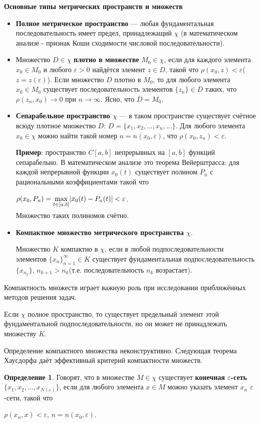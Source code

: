 \documentclass[12pt,a4paper,titlepage]{book}
\theoremstyle{definition}
\newtheorem{definition}{Определение}
\theoremstyle{plain}
\theoremstyle{remark}
\theoremstyle{plain}
\begin{document}
\begin{large}
\textbf{Основные типы метрических пространств и множеств}
\end{large}
\begin{itemize}
\item \textbf{Полное метрическое пространство} --- любая фундаментальная последовательность имеет предел, принадлежащий $\chi$ (в математическом анализе - признак Коши сходимости числовой последовательности).
\item Множество $D\in\chi$ \textbf{плотно в множестве} $ M_0 \in \chi$, если для каждого элемента $x_0 \in M_0$ и любого $\varepsilon>0$ найдётся элемент $z \in D$, такой что $\rho(x_0, z)<\varepsilon$($z=z(\varepsilon)$). Если множество $D$ плотно в $M_0$, то для любого элемента $x_0\in M_0$ существует последовательность элементов $\lbrace z_n \rbrace \in D$ таких, что $\rho(z_n, x_0)\rightarrow0$ при $n\rightarrow\infty$. Ясно, что $\overline{D}=M_0$.
\item \textbf{Сепарабельное пространство $\chi$} --- в таком пространстве существует счётное всюду плотное множество $D$: $D=\lbrace x_1,x_2,\ldots,x_n,\ldots \rbrace$. Для любого элемента $x_0 \in \chi$ можно найти такой номер $n=n(x_0,\varepsilon)$, что $\rho(x_0, z_n)<\varepsilon$.

\textbf{Пример}: пространство $C[a,b]$ непрерывных на $[a,b]$ функций сепарабельно. В математическом анализе это теорема Вейерштрасса: для каждой непрерывной функции $x_0(t)$ существует полином $P_n$ с рациональными коэффициентами такой что
\begin{center}
 $\rho(x_0, P_n)=\smash{\displaystyle\max_{t \in [a,b]}} |x_0(t)-P_n(t)| <\varepsilon$.
\end{center}
Множество таких полиномов счётно.
\item \textbf{Компактное множество метрического пространства $\chi$}.

Множество $K$ компактно в $\chi$, если в любой подпоследовательности элементов $\lbrace x_n \rbrace_{n=1}^{\infty} \in K$ существует фундаментальная подпоследовательность $\lbrace x_{n_k} \rbrace$, $n_{k+1}>n_k$(т.е. последовательность $n_k$ возрастает).
\end{itemize}

	Компактность множеств играет важную роль при исследовании приближённых методов решения задач.
\par Если $\chi$ полное пространство, то существует предельный элемент этой фундаментальной подпоследовательности, но он может не принадлежать множеству $K$.
\par Определение компактного множества неконструктивно. Следующая теорема Хаусдорфа даёт эффективный критерий компактности множеств.
\begin{definition}
Говорят, что в множестве $M \in \chi$ существует \textbf{конечная $\varepsilon$-сеть$\lbrace x_1,x_2,\ldots,x_{N(\varepsilon)} \rbrace$}, если для любого элемента $x \in M$ можно указать элемент $x_n$ $\varepsilon$-сети, такой что
\begin{center}
 $\rho(x_n, x) <\varepsilon$, $n=n(x_0,\varepsilon)$.
\end{center}
\end{definition}
\end{document}
